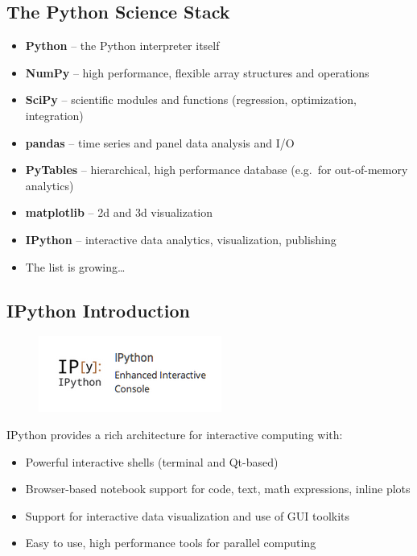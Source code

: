 \documentclass{article}
\begin{document}
    \subsection{The Python Science Stack}

\begin{itemize}
\item
  \textbf{Python} -- the Python interpreter itself
\item
  \textbf{NumPy} -- high performance, flexible array structures and
  operations
\item
  \textbf{SciPy} -- scientific modules and functions (regression,
  optimization, integration)
\item
  \textbf{pandas} -- time series and panel data analysis and I/O
\item
  \textbf{PyTables} -- hierarchical, high performance database (e.g.~for
  out-of-memory analytics)
\item
  \textbf{matplotlib} -- 2d and 3d visualization
\item
  \textbf{IPython} -- interactive data analytics, visualization,
  publishing
\item
  The list is growing\ldots{}
\end{itemize}

    \subsection{IPython Introduction}

\begin{figure}[htbp]
\centering
\includegraphics{static/img/ipy.png}
\end{figure}

IPython provides a rich architecture for interactive computing with:

\begin{itemize}
\item
  Powerful interactive shells (terminal and Qt-based)
\item
  Browser-based notebook support for code, text, math expressions,
  inline plots
\item
  Support for interactive data visualization and use of GUI toolkits
\item
  Easy to use, high performance tools for parallel computing
\end{itemize}
\end{document}
